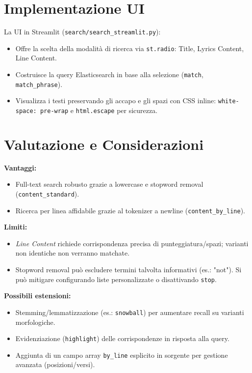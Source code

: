 \documentclass[a4paper,11pt]{article}
\begin{document}
\section{Implementazione UI}
La UI in Streamlit (\texttt{search/search\_streamlit.py}):
\begin{itemize}[nosep]
  \item Offre la scelta della modalità di ricerca via \texttt{st.radio}: Title, Lyrics Content, Line Content.
  \item Costruisce la query Elasticsearch in base alla selezione (\texttt{match}, \texttt{match\_phrase}).
  \item Visualizza i testi preservando gli accapo e gli spazi con CSS inline: \texttt{white-space: pre-wrap} e \texttt{html.escape} per sicurezza.
\end{itemize}

\section{Valutazione e Considerazioni}
\textbf{Vantaggi:}
\begin{itemize}[nosep]
  \item Full-text search robusto grazie a lowercase e stopword removal (\texttt{content\_standard}).
  \item Ricerca per linea affidabile grazie al tokenizer a newline (\texttt{content\_by\_line}).
\end{itemize}
\textbf{Limiti:}
\begin{itemize}[nosep]
  \item \emph{Line Content} richiede corrispondenza precisa di punteggiatura/spazi; varianti non identiche non verranno matchate.
  \item Stopword removal può escludere termini talvolta informativi (es.: "not"). Si può mitigare configurando liste personalizzate o disattivando \texttt{stop}.
\end{itemize}
\textbf{Possibili estensioni:}
\begin{itemize}[nosep]
  \item Stemming/lemmatizzazione (es.: \texttt{snowball}) per aumentare recall su varianti morfologiche.
  \item Evidenziazione (\texttt{highlight}) delle corrispondenze in risposta alla query.
  \item Aggiunta di un campo array \texttt{by\_line} esplicito in sorgente per gestione avanzata (posizioni/versi).
\end{itemize}
\end{document}
